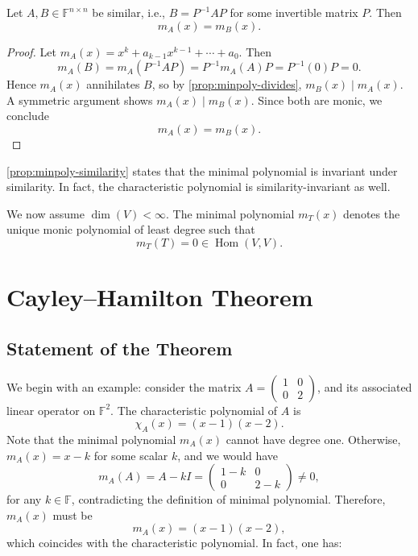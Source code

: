 \begin{proposition}\label{prop:minpoly-similarity}
Let \( A, B \in \mathbb{F}^{n \times n} \) be similar, i.e., \( B = P^{-1} A P \) for some invertible matrix \( P \). Then
\[
m_A(x) = m_B(x).
\]
\end{proposition}

\begin{proof}
Let \( m_A(x) = x^k + a_{k-1}x^{k-1} + \cdots + a_0 \). Then
\[
m_A(B) = m_A(P^{-1} A P) = P^{-1} m_A(A) P = P^{-1}(0)P = 0.
\]
Hence \( m_A(x) \) annihilates \( B \), so by \autoref{prop:minpoly-divides}, \( m_B(x) \mid m_A(x) \). A symmetric argument shows \( m_A(x) \mid m_B(x) \). Since both are monic, we conclude
\[
m_A(x) = m_B(x).
\]
\end{proof}

\begin{remark}
\autoref{prop:minpoly-similarity} states that the minimal polynomial is invariant under similarity. In fact, the characteristic polynomial is similarity-invariant as well.
\end{remark}


We now assume \( \dim(V) < \infty \). The minimal polynomial \( m_T(x) \) denotes the unique monic polynomial of least degree such that
\[
m_T(T) = 0 \in \operatorname{Hom}(V, V).
\]



\section{Cayley–Hamilton Theorem}
\subsection{Statement of the Theorem}
We begin with an example: consider the matrix \( A = \begin{pmatrix} 1 & 0 \\ 0 & 2 \end{pmatrix} \), and its associated linear operator on \( \mathbb{F}^2 \). The characteristic polynomial of \( A \) is
\[
\chi_A(x) = (x - 1)(x - 2).
\]
Note that the minimal polynomial \( m_A(x) \) cannot have degree one. Otherwise, \( m_A(x) = x - k \) for some scalar \( k \), and we would have
\[
m_A(A) = A - k I = \begin{pmatrix} 1 - k & 0 \\ 0 & 2 - k \end{pmatrix} \neq 0,
\]
for any \( k \in \mathbb{F} \), contradicting the definition of minimal polynomial. Therefore, \( m_A(x) \) must be
\[
m_A(x) = (x - 1)(x - 2),
\]
which coincides with the characteristic polynomial. In fact, one has:

